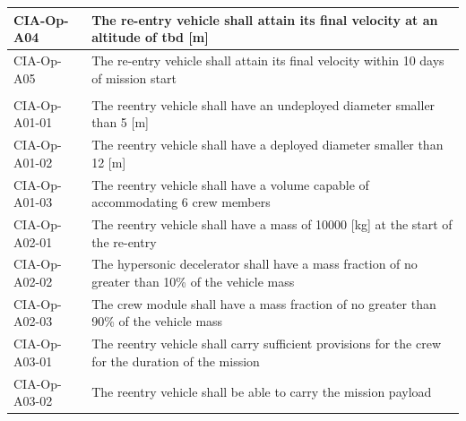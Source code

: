 \begin{table}[H]
\begin{tabular}{|p{}|p{}|}
	CIA-Op-A04 & The re-entry vehicle shall attain its final velocity at an altitude of \gls{tbd} [m] \\ \hline
	CIA-Op-A05 & The re-entry vehicle shall attain its final velocity within 10 days of mission start \\ \hline
& \\ \hline
	CIA-Op-A01-01 & The reentry vehicle shall have an undeployed diameter smaller than 5 [m]                         				            \\ \hline
	CIA-Op-A01-02 & The reentry vehicle shall have a deployed diameter smaller than 12 [m]                         				            \\ \hline
	CIA-Op-A01-03 & The reentry vehicle shall have a volume capable of accommodating 6 crew members                        				            \\ \hline
	CIA-Op-A02-01 & The reentry vehicle shall have a mass of 10000 [kg] at the start of the re-entry                       				            \\ \hline
	CIA-Op-A02-02 & The hypersonic decelerator shall have a mass fraction of no greater than 10\% of the vehicle mass  \\ \hline
	CIA-Op-A02-03 & The crew module shall have a mass fraction of no greater than 90\% of the vehicle mass \\ \hline
	CIA-Op-A03-01 & The reentry vehicle shall carry sufficient provisions for the crew for the duration of the mission \\ \hline
	CIA-Op-A03-02 & The reentry vehicle shall be able to carry the mission payload								\\ \hline	
    \end{tabular}
   
\end{table}











